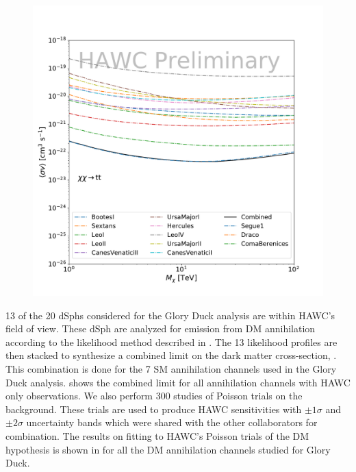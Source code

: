\begin{figure}[ht]
{    \includegraphics[scale=0.215]{figures/glory_duck/hawc/Combined95_GD_tt.pdf}
    }
    \caption{}
 \label{fig:hawc_combined_limit}
\end{figure}

13 of the 20 dSphs considered for the Glory Duck analysis are within HAWC's field of view.
These dSph are analyzed for emission from DM annihilation according to the likelihood method described in .
The 13 likelihood profiles are then stacked to synthesize a combined limit on the dark matter cross-section, \sv.
This combination is done for the 7 SM annihilation channels used in the Glory Duck analysis.
 shows the combined limit for all annihilation channels with HAWC only observations.
We also perform 300 studies of Poisson trials on the background.
These trials are used to produce HAWC sensitivities with $\pm1\sigma$ and $\pm2\sigma$ uncertainty bands which were shared with the other collaborators for combination.
The results on fitting to HAWC's Poisson trials of the DM hypothesis is shown in  for all the DM annihilation channels studied for Glory Duck.

